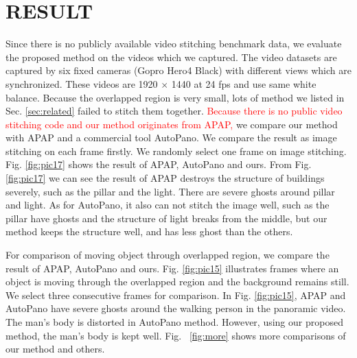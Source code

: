 \documentclass[conference]{IEEEtran}
\begin{document}
\section{RESULT}
\label{sec:result}

Since there is no publicly available video stitching benchmark data, we evaluate the proposed method on the 
videos which we captured.  The video datasets are captured by six fixed cameras (Gopro Hero4 Black) with different views which are synchronized. 
These videos are 1920 $\times$ 1440 at 24 fps and use same white balance.
Because the overlapped region is very small, lots of method we listed in Sec. \ref{sec:related} failed to stitch them together.
\textcolor{red}{Because there is no public video stitching code and our method originates from APAP,}
we compare our method with APAP and a commercial tool AutoPano. We compare the result as image stitching on each frame firstly.
We randomly select one frame on image stitching. Fig. \ref{fig:pic17} shows the result of APAP, AutoPano and ours. 
From Fig. \ref{fig:pic17} we can see the result of APAP 
destroys the structure of buildings severely, such as the pillar and the light. There are severe ghosts around pillar and light.
As for AutoPano, it also can not stitch the image well, such as the pillar have ghosts and the structure of light breaks from the middle, 
but our method keeps the structure well, and has less ghost than the others.

For comparison of moving object through overlapped region, we compare the result of APAP, AutoPano and ours. Fig. \ref{fig:pic15} 
illustrates frames where an object is moving through the overlapped region and the background remains still. 
We select three consecutive frames for comparison. In Fig. \ref{fig:pic15}, APAP and AutoPano have severe ghosts around the walking person in the panoramic video. 
The man's body is distorted in AutoPano method. However, using our proposed method, the man's body is kept well. 
Fig. ~\ref{fig:more} shows more comparisons of our method and others.
\end{document}
